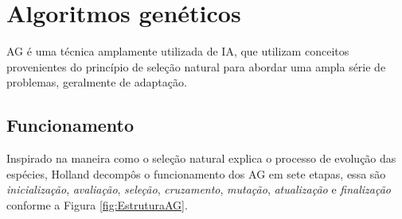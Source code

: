 \section{Algoritmos genéticos}

AG é uma técnica amplamente utilizada de IA, que utilizam conceitos provenientes do princípio de seleção natural para abordar uma  ampla série de problemas, geralmente de adaptação. \cite{DiogoCLucas}

\subsection{Funcionamento}
 
Inspirado na maneira como o seleção natural explica o processo de evolução das espécies, Holland \cite{Holland1975} decompôs o funcionamento dos AG em sete etapas, essa são \textit{inicialização}, \textit{avaliação}, \textit{seleção}, \textit{cruzamento}, \textit{mutação}, \textit{atualização} e  \textit{finalização} conforme a Figura \ref{fig:EstruturaAG}. 

\begin{minipage}{\linewidth}
    \label{fig:EstruturaAG}
\end{minipage}


